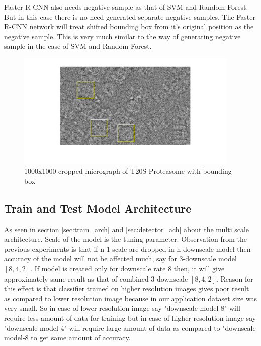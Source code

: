 \documentclass{report}
\begin{document}
Faster R-CNN also needs negative sample as that of SVM and Random Forest. But in this case there is no need generated separate negative samples. The Faster R-CNN network will treat shifted bounding box from it's original position as the negative sample. This is very much similar to the way of generating negative sample in the case of SVM and Random Forest.

\begin{figure}[h]
\includegraphics[width=0.95\textwidth]{fastercnn-EM110025.png}
\centering
\captionsetup{justification=centering}
\caption{1000x1000 cropped micrograph of T20S-Proteasome with bounding box}
\label{fig:fastercnn-EM110025-train}
\end{figure}


\subsection{Train and Test Model Architecture}
As seen in section \ref{sec:train_arch} and \ref{sec:detector_ach} about the multi scale architecture. Scale of the model is the tuning parameter. Observation from the previous experiments is that if n-1 scale are dropped in n downscale model then accuracy of the model will not be affected much, say  for 3-downscale model $[8,4,2]$. If model is created only for downscale rate 8 then, it will give approximately same result as that of combined 3-downscale $[8,4,2]$. Reason for this effect is that classifier trained on higher resolution images gives poor result as compared to lower resolution image because in our application dataset size was very small. So in case of lower resolution image say "downscale model-8" will require less amount of data for training but in case of higher resolution image say "downscale model-4"  will require large amount of data as compared to "downscale model-8 to get same amount of accuracy.
\end{document}
